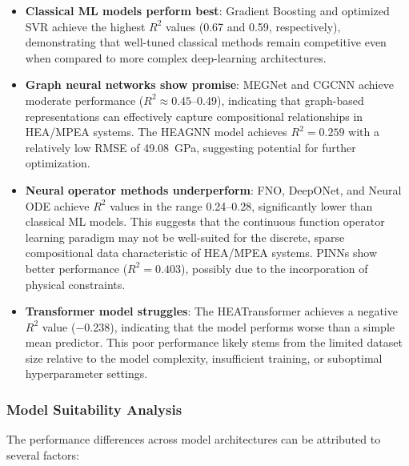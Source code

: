 \documentclass[11pt,a4paper]{article}
\begin{document}
\begin{itemize}
  \item \textbf{Classical ML models perform best}: Gradient Boosting and optimized SVR achieve the highest $R^2$ values (0.67 and 0.59, respectively), demonstrating that well-tuned classical methods remain competitive even when compared to more complex deep-learning architectures.
  
  \item \textbf{Graph neural networks show promise}: MEGNet and CGCNN achieve moderate performance ($R^2 \approx 0.45$--0.49), indicating that graph-based representations can effectively capture compositional relationships in HEA/MPEA systems. The HEAGNN model achieves $R^2 = 0.259$ with a relatively low RMSE of 49.08~GPa, suggesting potential for further optimization.
  
  \item \textbf{Neural operator methods underperform}: FNO, DeepONet, and Neural ODE achieve $R^2$ values in the range 0.24--0.28, significantly lower than classical ML models. This suggests that the continuous function operator learning paradigm may not be well-suited for the discrete, sparse compositional data characteristic of HEA/MPEA systems. PINNs show better performance ($R^2 = 0.403$), possibly due to the incorporation of physical constraints.
  
  \item \textbf{Transformer model struggles}: The HEATransformer achieves a negative $R^2$ value ($-$0.238), indicating that the model performs worse than a simple mean predictor. This poor performance likely stems from the limited dataset size relative to the model complexity, insufficient training, or suboptimal hyperparameter settings.
\end{itemize}

\subsubsection{Model Suitability Analysis}

The performance differences across model architectures can be attributed to several factors:
\end{document}
